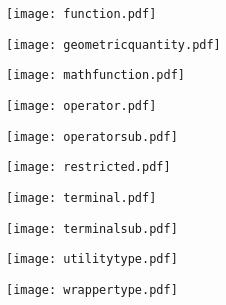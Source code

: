 \documentclass{beamer}
\begin{document}
\begin{frame}
\begin{figure}\texttt{[image: function.pdf]}\end{figure}
\end{frame}

\begin{frame}
\begin{figure}\texttt{[image: geometricquantity.pdf]}\end{figure}
\end{frame}

\begin{frame}
\begin{figure}\texttt{[image: mathfunction.pdf]}\end{figure}
\end{frame}

\begin{frame}
\begin{figure}\texttt{[image: operator.pdf]}\end{figure}
\end{frame}

\begin{frame}
\begin{figure}\texttt{[image: operatorsub.pdf]}\end{figure}
\end{frame}

\begin{frame}
\begin{figure}\texttt{[image: restricted.pdf]}\end{figure}
\end{frame}

\begin{frame}
\begin{figure}\texttt{[image: terminal.pdf]}\end{figure}
\end{frame}

\begin{frame}
\begin{figure}\texttt{[image: terminalsub.pdf]}\end{figure}
\end{frame}

\begin{frame}
\begin{figure}\texttt{[image: utilitytype.pdf]}\end{figure}
\end{frame}

\begin{frame}
\begin{figure}\texttt{[image: wrappertype.pdf]}\end{figure}
\end{frame}
\end{document}
